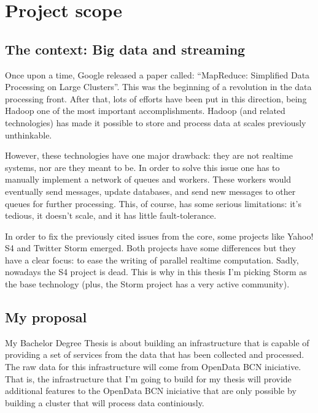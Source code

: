 
\section{Project scope}

\subsection{The context: Big data and streaming}

Once upon a time, Google released a paper called: ``MapReduce: Simplified Data
Processing on Large Clusters''\cite{mapreduce}. This was the beginning of
a revolution in the data processing front. After that, lots of efforts
have been put in this direction, being Hadoop one of the most important
accomplishments. Hadoop (and related technologies) has made it possible
to store and process data at scales previously unthinkable.

However, these technologies have one major drawback: they are not realtime
systems, nor are they meant to be. In order to solve this issue one has to
manually implement a network of queues and workers. These workers would
eventually send messages, update databases, and send new messages to other
queues for further processing. This, of course, has some serious limitations:
it's tedious, it doesn't scale, and it has little fault-tolerance.

In order to fix the previously cited issues from the core, some projects like
Yahoo! S4 and Twitter Storm emerged. Both projects have some differences but
they have a clear focus: to ease the writing of parallel realtime computation.
Sadly, nowadays the S4 project is dead. This is why in this thesis I'm picking
Storm\cite{storm} as the base technology (plus, the Storm project has a very
active community).

\subsection{My proposal}

My Bachelor Degree Thesis is about building an infrastructure that is capable
of providing a set of services from the data that has been collected and
processed. The raw data for this infrastructure will come from OpenData
BCN\cite{opendata} iniciative. That is, the infrastructure that I'm going
to build for my thesis will provide additional features to the OpenData
BCN iniciative that are only possible by building a cluster that will
process data continiously.

